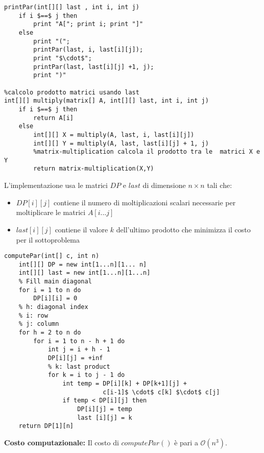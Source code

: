 \documentclass[../cheatSheetAlgoritmi.tex]{subfiles}
\begin{document}
\newpage
\begin{lstlisting}[caption= Calcolo prodotto di matrici e stampa parentesizzazione ottima usando matrice last]
%ricostruzione della soluzione (stampa prodotto)
printPar(int[][] last , int i, int j)
	if i $==$ j then
		print "A["; print i; print "]"
	else
		print "(";
		printPar(last, i, last[i][j]);
		print "$\cdot$";
		printPar(last, last[i][j] +1, j);
		print ")"

%calcolo prodotto matrici usando last 
int[][] multiply(matrix[] A, int[][] last, int i, int j)
	if i $==$ j then
		return A[i]
	else
		int[][] X = multiply(A, last, i, last[i][j])
		int[][] Y = multiply(A, last, last[i][j] + 1, j)
		%matrix-multiplication calcola il prodotto tra le  matrici X e Y
		return matrix-multiplication(X,Y)
\end{lstlisting}
\noindent
L'implementazione usa le matrici $DP$ e $last$ di dimensione $n \times n$ tali che:
\begin{itemize}
	\item $DP[i][j]$ contiene il numero di moltiplicazioni scalari necessarie per moltiplicare le matrici $A[i...j]$ 
	\item $last [i][j]$ contiene il valore $k$ dell'ultimo prodotto che minimizza il costo per il sottoproblema
\end{itemize}
\begin{lstlisting}[caption= Calcolo parentesizzazione ottima]
%calcolo della soluzione ottima
computePar(int[] c, int n)
	int[][] DP = new int[1...n][1... n]
	int[][] last = new int[1...n][1...n]
	% Fill main diagonal
	for i = 1 to n do 
		DP[i][i] = 0
	% h: diagonal index
	% i: row
	% j: column
	for h = 2 to n do
		for i = 1 to n - h + 1 do 
			int j = i + h - 1 
			DP[i][j] = +inf
			% k: last product
			for k = i to j - 1 do 
				int temp = DP[i][k] + DP[k+1][j] + 
				           c[i-1]$ \cdot$ c[k] $\cdot$ c[j]
				if temp < DP[i][j] then
					DP[i][j] = temp
					last [i][j] = k
	return DP[1][n]
\end{lstlisting}
\textbf{Costo computazionale:} Il costo di $computePar()$ è pari a $\mathcal{O}(n^{3})$.
\newpage
\end{document}
